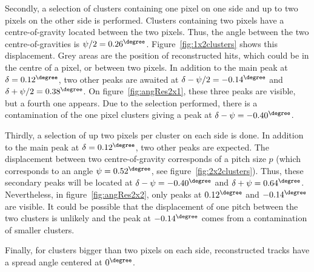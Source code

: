    Secondly, a selection of clusters containing one pixel on one side and up to two pixels on the other side is performed.
   Clusters containing two pixels have a centre-of-gravity located between the two pixels.
   Thus, the angle between the two centre-of-gravities is $\psi/2 = 0.26^{\degree}$.
   Figure~\ref{fig:1x2clusters} shows this displacement. 
   Grey areas are the position of reconstructed hits, which could be in the centre of a pixel, or between two pixels. 
   In addition to the main peak at $\delta = 0.12^{\degree}$, two other peaks are awaited at $\delta - \psi/2 = -0.14^{\degree}$ and $\delta + \psi/2 = 0.38^{\degree}$.
   On figure~\ref{fig:angRes2x1}, these three peaks are visible, but a fourth one appears. 
   Due to the selection performed, there is a contamination of the one pixel clusters giving a peak at $\delta - \psi = -0.40^{\degree}$.

   Thirdly, a selection of up two pixels per cluster on each side is done.
   In addition to the main peak at $\delta = 0.12^{\degree}$, two other peaks are expected.
   The displacement between two centre-of-gravity corresponds of a pitch size $p$ (which corresponds to an angle $\psi = 0.52^{\degree}$, see figure~\ref{fig:2x2clusters}).
   Thus, these secondary peaks will be located at $\delta - \psi = -0.40^{\degree}$ and $\delta + \psi = 0.64^{\degree}$.
   Nevertheless, in figure~\ref{fig:angRes2x2}, only peaks at $0.12^{\degree}$ and $-0.14^{\degree}$ are visible.
   It could be possible that the displacement of one pitch between the two clusters is unlikely and the peak at $-0.14^{\degree}$ comes from a contamination of smaller clusters.

   Finally, for clusters bigger than two pixels on each side, reconstructed tracks have a spread angle centered at $0^{\degree}$.
   
